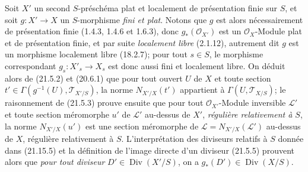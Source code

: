\begin{env}[21.15.8]
\label{IV.21.15.8}
Soit $X'$ un second $S$-préschéma plat et localement de présentation finie sur $S$, et
soit $g:X'\to X$ un $S$-morphisme \emph{fini et plat}. Notons que $g$ est alors
nécessairement de présentation finie (1.4.3, 1.4.6 et 1.6.3), donc
$g_*(\mathcal O_{X'})$ est un $\mathcal O_X$-Module plat et de présentation finie, et
par suite \emph{localement libre} (2.1.12), autrement dit $g$ est un morphisme
localement libre (18.2.7); pour tout $s\in S$, le morphisme correspondant
$g_s:X'_s\to X_s$ est donc aussi fini et localement libre. On déduit alors de (21.5.2)
et (20.6.1) que pour tout ouvert $U$ de $X$ et toute section
$t'\in\Gamma(g^{-1}(U),\mathscr T_{X'/S})$, la norme $N_{X'/X}(t')$ appartient à
$\Gamma(U,\mathscr T_{X/S})$; le raisonnement de (21.5.3) prouve ensuite que pour tout
$\mathcal O_{X'}$-Module inversible $\mathscr L'$ et toute section méromorphe $u'$ de
$\mathscr L'$ au-dessus de $X'$, \emph{régulière relativement à $S$}, la norme
$N_{X'/X}(u')$ est une section méromorphe de
$\mathscr L=N_{X'/X}(\mathscr L')$ au-dessus de $X$, régulière relativement à $S$.
L'interprétation des diviseurs relatifs à $S$ donnée dans (21.15.5) et la définition de
l'image directe d'un diviseur (21.5.5) prouvent alors que \emph{pour tout diviseur}
$D'\in\operatorname{Div}(X'/S)$, on a $g_*(D')\in\operatorname{Div}(X/S)$.
\end{env}

